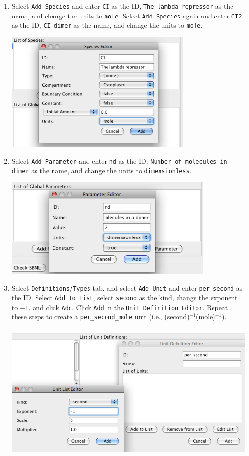 \documentclass[titlepage,11pt]{article}
\begin{document}
\begin{enumerate}
\item Select {\tt Add Species} and enter {\tt CI} as the ID, 
{\tt The lambda repressor} as the name, and change the units 
to {\tt mole}.  Select {\tt Add Species} again and enter {\tt CI2} as the ID,
{\tt CI dimer} as the name, and change the units to {\tt mole}.

\includegraphics[height=60mm]{screenshots/species}

\item Select {\tt Add Parameter} and enter {\tt nd} as the ID,
      {\tt Number of molecules in dimer} as the name, and change the
      units to {\tt dimensionless}.

\includegraphics[height=50mm]{screenshots/parameter}

\item Select {\tt Definitions/Types} tab, and select {\tt Add Unit}
      and enter {\tt per\_second} as the ID.  Select {\tt Add to List}, 
      select {\tt second} as the kind, change the exponent to $-1$, 
      and click {\tt Add}.  Click {\tt Add} in the {\tt Unit Definition Editor}.
      Repeat these steps to create a {\tt per\_second\_mole} unit 
      (i.e., (second)$^{-1}$(mole)$^{-1}$).

\includegraphics[height=70mm]{screenshots/units}


\end{enumerate}
\end{document}
